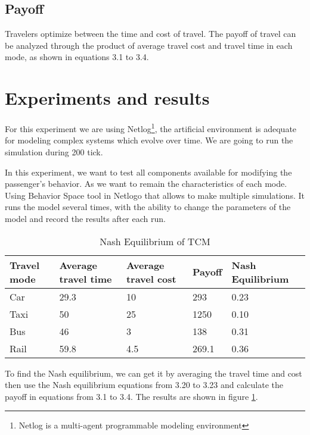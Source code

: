 \subsection{Payoff}
Travelers optimize between the time and cost of travel. The payoff of travel can be analyzed through the product of average travel cost and travel time in each mode, as shown in equations 3.1 to 3.4.

\section{Experiments and results}
For this experiment we are using Netlog\footnote{Netlog is a multi-agent programmable modeling environment}, the artificial environment is adequate for modeling complex systems which evolve over time. We are going to run the simulation during 200 tick.

In this experiment, we want to test all components available for modifying the passenger's behavior. As we want to remain the characteristics of each mode.
Using Behavior Space tool in Netlogo that allows to make multiple simulations. It runs the model several times, with the ability to change the parameters of the model and record the results after each run.
\begin{table}[h!]
\centering
\begin{tabular}{lllll}
\hline
\multicolumn{1}{l}{Travel mode} & \multicolumn{1}{l}{Average travel time} & \multicolumn{1}{l}{Average travel cost} & \multicolumn{1}{l}{Payoff} & Nash~ Equilibrium  \\ 
\hline
Car                             & 29.3                                    & 10                                      & 293                        & 0.23               \\
Taxi                            & 50                                      & 25                                      & 1250                       & 0.10               \\
Bus                             & 46                                      & 3                                       & 138                        & 0.31               \\
Rail                            & 59.8                                    & 4.5                           & 269.1                      
& 0.36                   
\end{tabular}
\caption{Nash Equilibrium of TCM}
\label{table:2}
\end{table}
To find the Nash equilibrium, we can get it by averaging the travel time and cost then use the Nash equilibrium equations from 3.20 to 3.23 and calculate the payoff in equations from 3.1 to 3.4. The results are shown in figure \ref{table:2}.

